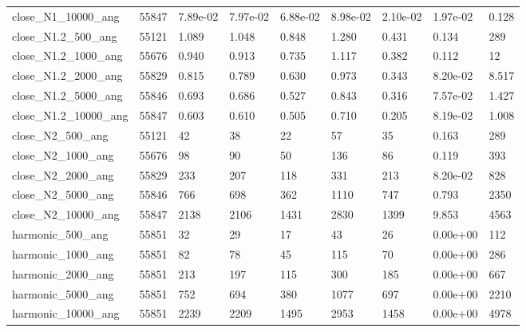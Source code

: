 \begin{tabular}{lrlllllll}
close\_N1\_10000\_ang & 55847 & 7.89e-02 & 7.97e-02 & 6.88e-02 & 8.98e-02 & 2.10e-02 & 1.97e-02 & 0.128 \\
close\_N1.2\_500\_ang & 55121 & 1.089 & 1.048 & 0.848 & 1.280 & 0.431 & 0.134 & 289 \\
close\_N1.2\_1000\_ang & 55676 & 0.940 & 0.913 & 0.735 & 1.117 & 0.382 & 0.112 & 12 \\
close\_N1.2\_2000\_ang & 55829 & 0.815 & 0.789 & 0.630 & 0.973 & 0.343 & 8.20e-02 & 8.517 \\
close\_N1.2\_5000\_ang & 55846 & 0.693 & 0.686 & 0.527 & 0.843 & 0.316 & 7.57e-02 & 1.427 \\
close\_N1.2\_10000\_ang & 55847 & 0.603 & 0.610 & 0.505 & 0.710 & 0.205 & 8.19e-02 & 1.008 \\
close\_N2\_500\_ang & 55121 & 42 & 38 & 22 & 57 & 35 & 0.163 & 289 \\
close\_N2\_1000\_ang & 55676 & 98 & 90 & 50 & 136 & 86 & 0.119 & 393 \\
close\_N2\_2000\_ang & 55829 & 233 & 207 & 118 & 331 & 213 & 8.20e-02 & 828 \\
close\_N2\_5000\_ang & 55846 & 766 & 698 & 362 & 1110 & 747 & 0.793 & 2350 \\
close\_N2\_10000\_ang & 55847 & 2138 & 2106 & 1431 & 2830 & 1399 & 9.853 & 4563 \\
harmonic\_500\_ang & 55851 & 32 & 29 & 17 & 43 & 26 & 0.00e+00 & 112 \\
harmonic\_1000\_ang & 55851 & 82 & 78 & 45 & 115 & 70 & 0.00e+00 & 286 \\
harmonic\_2000\_ang & 55851 & 213 & 197 & 115 & 300 & 185 & 0.00e+00 & 667 \\
harmonic\_5000\_ang & 55851 & 752 & 694 & 380 & 1077 & 697 & 0.00e+00 & 2210 \\
harmonic\_10000\_ang & 55851 & 2239 & 2209 & 1495 & 2953 & 1458 & 0.00e+00 & 4978 \\
\bottomrule
\end{tabular}
